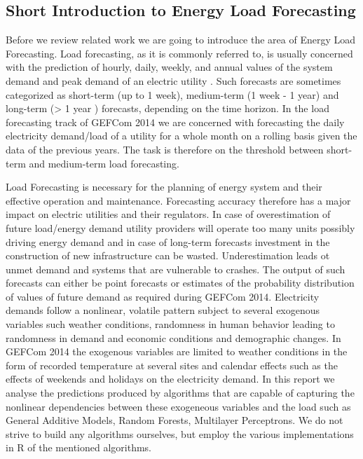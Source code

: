 \documentclass[conference]{IEEEtran}
\begin{document}
\subsection{Short Introduction to Energy Load Forecasting}
Before we review related work we are going to introduce the area of Energy Load Forecasting. Load forecasting, as it is commonly referred to, is usually concerned with the prediction of hourly, daily, weekly, and annual values of the system demand and peak demand of an electric utility \cite{Fan2010}. Such forecasts are sometimes categorized as short-term (up to 1 week), medium-term (1 week - 1 year) and long-term (> 1 year ) forecasts, depending on the time horizon. In the load forecasting track of GEFCom 2014 we are concerned with forecasting the daily electricity demand/load of a utility for a whole month on a rolling basis given the data of the previous years. The task is therefore on the threshold between short-term and medium-term load forecasting.\par
Load Forecasting is necessary for the planning of energy system and their effective operation and maintenance. Forecasting accuracy therefore has a major impact on electric utilities and their regulators. In case of overestimation of future load/energy demand utility providers will operate too many units possibly driving energy demand and in case of long-term forecasts investment in the construction of new infrastructure can be wasted. Underestimation leads ot unmet demand and systems that are vulnerable to crashes.  
The output of such forecasts can either be point forecasts or estimates of the probability distribution of values of future demand as required during GEFCom 2014.
Electricity demands follow a nonlinear, volatile pattern subject to several exogenous variables such weather conditions, randomness in human behavior leading to randomness in demand and economic conditions and demographic changes. In GEFCom 2014 the exogenous variables are limited to weather conditions in the form of recorded temperature at several sites and calendar effects such as the effects of weekends and holidays on the electricity demand.
In this report we analyse the predictions produced by algorithms that are capable of capturing the nonlinear dependencies between these exogeneous variables and the load such as General Additive Models, Random Forests, Multilayer Perceptrons. We do not strive to build any algorithms ourselves, but employ the various implementations in R of the mentioned algorithms.

\end{document}
